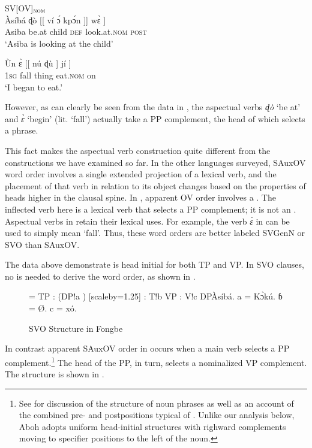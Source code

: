 \documentclass[output=paper,newtxmath,modfonts,nonflat,draftmode]{langsci/langscibook}
\begin{document}
\ea \label{ex:Fongbe-SVOV} {SV[OV]$_{\textsc{nom}}$}\\
\ea \gll Àsíbá  {ɖò} [[ ví {\'ɔ}  {kp{\'ɔ}n} ]] {w{\`ɛ}} ]  \\
Asiba be.at {} child \textsc{def} look.at.\textsc{nom} {} \textsc{post}  \\
\glt `Asiba is looking at the child' \hfill \citep[][215]{lefebvre2002}

\ex \label{ex:Fongbe-SVOVa} \gll Ùn {\`ɛ} [[  {nú}  {ɖù}  ] jí ]  \\
1\textsc{sg} fall {} thing eat.\textsc{nom} {} on  \\
\glt `I began to eat.' \hfill \citep[][215]{lefebvre2002}
\z
\z

However, as can clearly be seen from the data in , the aspectual verbs \textit{{ɖò}} `be at' and \textit{{\`ɛ}} `begin' (lit. `fall') actually take a PP complement, the head of which selects a  phrase. 

This fact makes the  aspectual verb construction quite different from the constructions we have examined so far. In the other languages surveyed, SAuxOV word order involves a single extended projection of a lexical verb, and the placement of that verb in relation to its object changes based on the properties of heads higher in the clausal spine. In , apparent OV order involves a . The inflected verb here is a lexical verb that selects a PP complement; it is not an . Aspectual verbs in  retain their lexical uses. For example, the verb \textit{{\`ɛ}} in  can be used to simply mean `fall'. Thus, these word orders are better labeled SVGenN or SVO than SAuxOV.

The data above demonstrate  is head initial for both TP and VP. In SVO clauses, no  is needed to derive the word order, as shown in . 

\begin{figure}
{\footnotesize \jtree[xunit=2.5em,yunit=1.25em]
\! = {TP}
: ({DP}!a ) [scaleby=1.25]
: {T}!b {VP}
: {V}!c {DP}{Àsíbá}.
\!a = {K{{\`ɔ}kú}}.
ɓ = {\O{}}.
\!c = {xó}.
\endjtree}
\caption{SVO Structure in Fongbe}
\label{fig:sande:Fongbe-SAuxVO}
\end{figure}

In contrast apparent SAuxOV order in  occurs when a main verb selects a PP complement.\footnote{See \citet{aboh10} for discussion of the structure of  noun phrases as well as an account of the combined pre- and postpositions typical of . Unlike our analysis below, Aboh adopts uniform head-initial structures with righward complements moving to specifier positions to the left of the noun.} The head of the PP, in turn, selects a nominalized VP complement. The structure is shown in .
\end{document}

